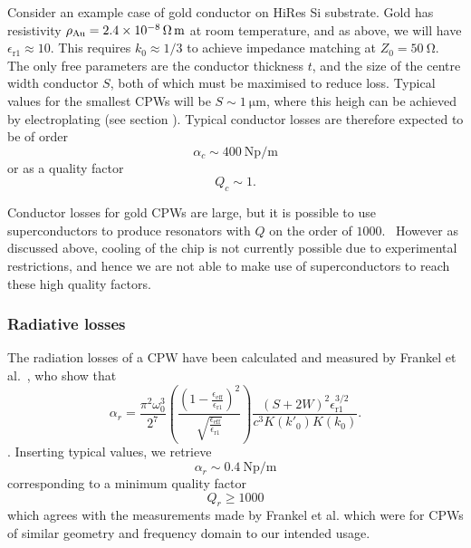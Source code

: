 Consider an example case of gold conductor on HiRes Si substrate. Gold has
resistivity $\rho_\mathrm{Au} = \SI{2.4E-8}{\ohm\metre}$ at room temperature,
and as above, we will have $\epsilon_\mathrm{r1} \approx 10$. This requires $k_0
\approx 1/3$ to achieve impedance matching at $Z_0 = \SI{50}{\ohm}$. The only
free parameters are the conductor thickness $t$, and the size of the centre
width conductor $S$, both of which must be maximised to reduce loss. Typical
values for the smallest CPWs will be $S\sim\SI{1}{\micro\metre}$, where
this heigh can be achieved by electroplating (see section ). Typical
conductor losses are therefore expected to be of order
\begin{equation}
  \alpha_c \sim \SI{400}{\neper\per\metre}
\end{equation}
or as a quality factor
\begin{equation}
  Q_c \sim 1.
\end{equation}

Conductor losses for gold CPWs are large, but it is possible to use
superconductors to produce resonators with $Q$ on the order of
$1000$.~\cite{Booth1999, Wallraff2004} However as discussed above, cooling of
the chip is not currently possible due to experimental restrictions, and hence
we are not able to make use of superconductors to reach these high quality
factors.

\subsubsection*{Radiative losses}

The radiation losses of a CPW have been calculated and measured by Frankel et
al.~\cite{Frankel1991}, who show that
\begin{equation}
  \alpha_r = \frac{\pi^2 \omega_0^3}{2^7}\left(\frac{\left(1 -
  \frac{\epsilon_\mathrm{eff}}{\epsilon_\mathrm{r1}}\right)^2}{\sqrt{\frac{\epsilon_\mathrm{eff}}{\epsilon_\mathrm{r1}}}}\right)
  \frac{(S+2W)^2\epsilon_\mathrm{r1}^{3/2}}{c^3 K(k'_0)K(k_0)}.
\end{equation}.
Inserting typical values, we retrieve
\begin{equation}
  \alpha_r \sim \SI{0.4}{\neper\per\metre}
\end{equation}
corresponding to a minimum quality factor
\begin{equation}
  Q_r \geq 1000
\end{equation}
which agrees with the measurements made by Frankel et al. which were for CPWs of
similar geometry and frequency domain to our intended usage.

